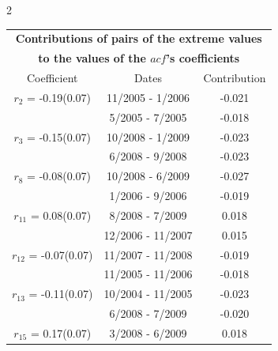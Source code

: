 
\thispagestyle{empty}
\begin{multicols}{2}{ 
\begin{tabular}{ccc}
\multicolumn{3}{c}{\textbf{Contributions of pairs of the extreme values} }  \vspace{-.10in}  \\ 
\multicolumn{3}{c}{ \textbf{to the values of the $acf$'s coefficients}} \\ 
\hline 
\hline                  Coefficient  &  Dates &  Contribution \\ 
\hline 
  $r_{ 2}$ = -0.19(0.07) &      11/2005 -  1/2006 &       -0.021    \vspace{-.10in} \\ 
  &        5/2005 -  7/2005 &       -0.018  \vspace{-.02in}   \\ \hline 
    $r_{ 3}$ = -0.15(0.07) &      10/2008 -  1/2009 &       -0.023    \vspace{-.10in} \\ 
  &        6/2008 -  9/2008 &       -0.023  \vspace{-.02in}   \\ \hline 
    $r_{ 8}$ = -0.08(0.07) &      10/2008 -  6/2009 &       -0.027    \vspace{-.10in} \\ 
  &        1/2006 -  9/2006 &       -0.019  \vspace{-.02in}   \\ \hline 
    $r_{11}$ = 0.08(0.07) &       8/2008 -  7/2009 &        0.018   \vspace{-.10in} \\  
&       12/2006 - 11/2007 &        0.015  \vspace{-.02in} \\ \hline 
  $r_{12}$ = -0.07(0.07) &      11/2007 - 11/2008 &       -0.019    \vspace{-.10in} \\ 
  &       11/2005 - 11/2006 &       -0.018  \vspace{-.02in}   \\ \hline 
    $r_{13}$ = -0.11(0.07) &      10/2004 - 11/2005 &       -0.023    \vspace{-.10in} \\ 
  &        6/2008 -  7/2009 &       -0.020  \vspace{-.02in}   \\ \hline 
    $r_{15}$ = 0.17(0.07) &       3/2008 -  6/2009 &        0.018   \vspace{-.10in} \\  

\end{tabular}}
\end{multicols}
